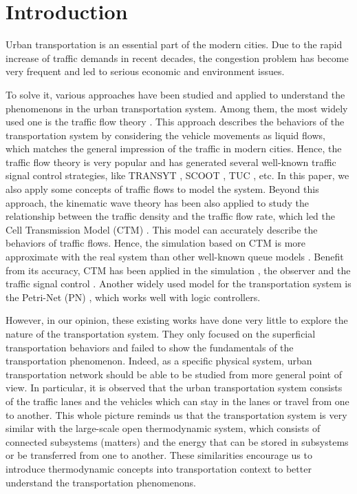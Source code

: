\documentclass[preprint,authoryear,12pt]{elsarticle}
\begin{document}
\section{Introduction}

Urban transportation is an essential part of the modern cities. Due to the rapid increase of traffic demands in recent decades, the congestion problem has become very frequent and led to serious economic and environment issues.

To solve it, various approaches have been studied and applied to understand the phenomenons in the urban transportation system. Among them, the most widely used one is the traffic flow theory \citep{nathan_h_gartner_revised_2005}. This approach describes the behaviors of the transportation system by considering the vehicle movements as liquid flows, which matches the general impression of the traffic in modern cities. Hence, the traffic flow theory is very popular and has generated several well-known traffic signal control strategies, like TRANSYT \citep{robertson_tansyt_1969,hale_traffic_2005}, SCOOT \citep{bretherton_r_d_scoot_1982}, TUC \citep{diakaki_multivariable_2002}, etc. In this paper, we also apply some concepts of traffic flows to model the system. Beyond this approach, the kinematic wave theory has been also applied to study the relationship between the traffic density and the traffic flow rate, which led the Cell Transmission Model (CTM) \citep{daganzo_cell_1995,flotterod_operational_2011}. This model can accurately describe the behaviors of traffic flows. Hence, the simulation based on CTM is more approximate with the real system than other well-known queue models \citep{almasri_online_2005}. Benefit from its accuracy, CTM has been applied in the simulation \citep{Su2013}, the observer \citep{CanudasdeWit2012} and the traffic signal control \citep{Pohlmann2010}. Another widely used model for the transportation system is the Petri-Net (PN) \citep{dotoli_urban_2006,ng_review_2013}, which works well with logic controllers.

However, in our opinion, these existing works have done very little to explore the nature of the transportation system. They only focused on the superficial transportation behaviors and failed to show the fundamentals of the transportation phenomenon. Indeed, as a specific physical system, urban transportation network should be able to be studied from more general point of view. In particular, it is observed that the urban transportation system consists of the traffic lanes and the vehicles which can stay in the lanes or travel from one to another. This whole picture reminds us that the transportation system is very similar with the large-scale open thermodynamic system, which consists of connected subsystems (matters) and the energy that can be stored in subsystems or be transferred from one to another. These similarities encourage us to introduce thermodynamic concepts into transportation context to better understand the transportation phenomenons.
\end{document}

